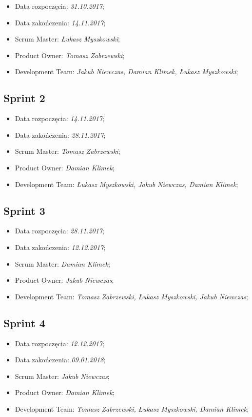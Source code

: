 \documentclass[a4paper]{article}
\begin{document}
	\begin{itemize}
		\item Data rozpoczęcia: \emph{31.10.2017};
		\item Data zakończenia: \emph{14.11.2017};
		\item Scrum Master: \emph{Łukasz Myszkowski};
		\item Product Owner: \emph{Tomasz Zabrzewski};
		\item Development Team: \emph{Jakub Niewczas, Damian Klimek, Łukasz Myszkowski};
	\end{itemize}
	
	\subsection{Sprint 2}
	
	\begin{itemize}
		\item Data rozpoczęcia: \emph{14.11.2017};
		\item  Data zakończenia: \emph{28.11.2017};
		\item Scrum Master: \emph{Tomasz Zabrzewski};
		\item Product Owner: \emph{Damian Klimek};
		\item Development Team: \emph{Łukasz Myszkowski, Jakub Niewczas, Damian Klimek};
	\end{itemize}

	\subsection{Sprint 3}

	\begin{itemize}
		\item Data rozpoczęcia: \emph{28.11.2017};
		\item  Data zakończenia: \emph{12.12.2017};
		\item Scrum Master: \emph{Damian Klimek};
		\item Product Owner: \emph{Jakub Niewczas};
		\item Development Team: \emph{Tomasz Zabrzewski, Łukasz Myszkowski, Jakub Niewczas};
	\end{itemize}
	
	\subsection{Sprint 4}

	\begin{itemize}
		\item Data rozpoczęcia: \emph{12.12.2017};
		\item  Data zakończenia: \emph{09.01.2018};
		\item Scrum Master: \emph{Jakub Niewczas};
		\item Product Owner: \emph{Damian Klimek};
		\item Development Team: \emph{Tomasz Zabrzewski, Łukasz Myszkowski, Damian Klimek};
	\end{itemize}
\end{document}
